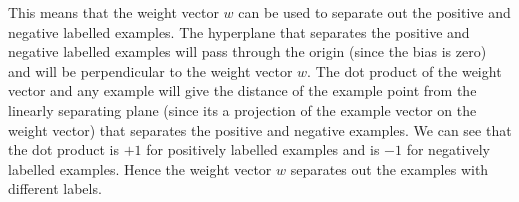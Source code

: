 \begin{enumerate}
This means that the weight vector $w$ can be used to separate out the positive and negative labelled examples. The hyperplane that separates the positive and negative labelled examples will pass through the origin (since the bias is zero) and will be perpendicular to the weight vector $w$. The dot product of the weight vector and any example will give the distance of the example point from the linearly separating plane (since it\textquotesingle s a projection of the example vector on the weight vector) that separates the positive and negative examples. We can see that the dot product is $+1$ for positively labelled examples and is $-1$ for negatively labelled examples. Hence the weight vector $w$ separates out the examples with different labels.
\end{enumerate}

